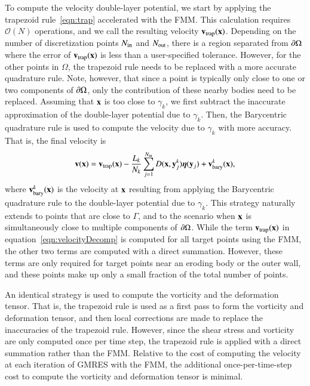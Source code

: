 \documentclass[preprint,10pt]{elsarticle}
\begin{document}
To compute the velocity double-layer potential, we start by applying the
trapezoid rule~\eqref{eqn:trap} accelerated with the FMM.  This
calculation requires $\mathcal{O}(N)$ operations, and we call the
resulting velocity ${\mathbf{v}}_{\mathrm{trap}}({\mathbf{x}})$.  Depending on the number of
discretization points $N_{\mathrm{in}}$ and $N_{\mathrm{out}}$, there is a region separated
from ${\partial}\Omega$ where the error of ${\mathbf{v}}_{\mathrm{trap}}({\mathbf{x}})$ is less than a
user-specified tolerance.  However, for the other points in $\Omega$,
the trapezoid rule needs to be replaced with a more accurate quadrature
rule.  Note, however, that since a point is typically only close to one
or two components of ${\partial}\Omega$, only the contribution of these nearby
bodies need to be replaced.  Assuming that ${\mathbf{x}}$ is too close to
$\gamma_k$, we first subtract the inaccurate approximation of the
double-layer potential due to $\gamma_k$.  Then, the Barycentric
quadrature rule is used to compute the velocity due to $\gamma_k$ with
more accuracy.  That is, the final velocity is
\begin{align}
  {\mathbf{v}}({\mathbf{x}}) = {\mathbf{v}}_{\mathrm{trap}}({\mathbf{x}}) - \frac{L_k}{N_k} \sum_{j=1}^{N_{\mathrm{in}}} 
    D({\mathbf{x}},{\mathbf{y}}^k_j) {\boldsymbol\eta}({\mathbf{y}}_j) + {\mathbf{v}}^k_{\mathrm{bary}}({\mathbf{x}}),
  \label{eqn:velocityDecomp}
\end{align}
where ${\mathbf{v}}^k_{\mathrm{bary}}({\mathbf{x}})$ is the velocity at ${\mathbf{x}}$ resulting from
applying the Barycentric quadrature rule to the double-layer potential
due to $\gamma_k$.  This strategy naturally extends to points that are
close to $\Gamma$, and to the scenario when ${\mathbf{x}}$ is simultaneously
close to multiple components of ${\partial}\Omega$.  While the term
${\mathbf{v}}_{\mathrm{trap}}({\mathbf{x}})$ in equation~\eqref{eqn:velocityDecomp} is computed for
all target points using the FMM, the other two terms are computed with a
direct summation.  However, these terms are only required for target
points near an eroding body or the outer wall, and these points make up
only a small fraction of the total number of points.  

An identical strategy is used to compute the vorticity and the
deformation tensor.  That is, the trapezoid rule is used as a first pass
to form the vorticity and deformation tensor, and then local corrections
are made to replace the inaccuracies of the trapezoid rule.  However,
since the shear stress and vorticity are only computed once per time
step, the trapezoid rule is applied with a direct summation rather than
the FMM.  Relative to the cost of computing the velocity at each
iteration of GMRES with the FMM, the additional once-per-time-step cost
to compute the vorticity and deformation tensor is minimal.
\end{document}
